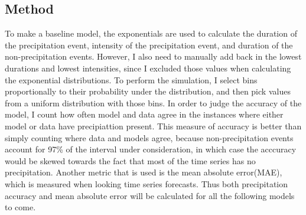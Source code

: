 \documentclass[11pt]{report}
\begin{document}
\subsection{Method}\label{sec:sfp_m}

To make a baseline model, the exponentials are used to
calculate the duration of the precipitation event, intensity of the
precipitation event, and duration of the non-precipitation events. However,
I also need to manually add back in the lowest durations and lowest
intensities, since I excluded those values when calculating the exponential
distributions. To perform the simulation, I select bins proportionally to
their probability under the distribution, and then pick values from a
uniform distribution with those bins. In order to judge the accuracy of the
model, I count how often model and data agree in the instances where either
model or data have precipiattion present.  This measure of accuracy is
better than simply counting where data and models agree, because
non-precipitation events account for 97\% of the interval under
consideration, in which case the acccuracy would be skewed towards the fact
that most of the time series has no precipitation. 
Another metric that is used is the mean absolute error(MAE), which is measured
when looking time series forecasts. Thus both precipitation accuracy and mean 
absolute error will be calculated for all the following models to come. 
\end{document}
